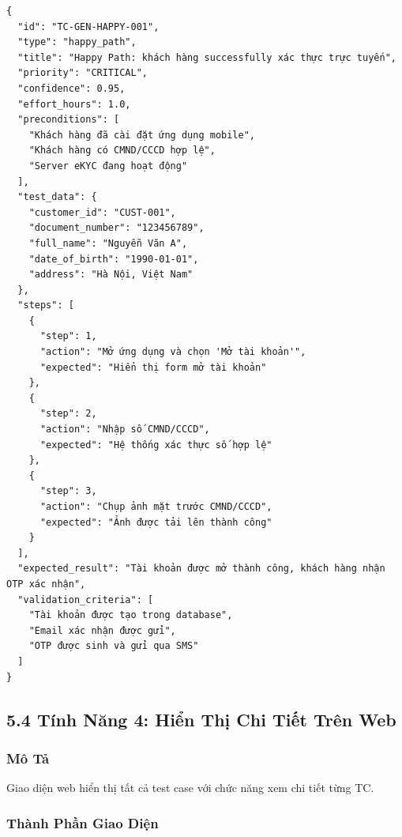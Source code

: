 \documentclass[14pt,a4paper]{article}
\begin{document}
\begin{lstlisting}
{
  "id": "TC-GEN-HAPPY-001",
  "type": "happy_path",
  "title": "Happy Path: khách hàng successfully xác thực trực tuyến",
  "priority": "CRITICAL",
  "confidence": 0.95,
  "effort_hours": 1.0,
  "preconditions": [
    "Khách hàng đã cài đặt ứng dụng mobile",
    "Khách hàng có CMND/CCCD hợp lệ",
    "Server eKYC đang hoạt động"
  ],
  "test_data": {
    "customer_id": "CUST-001",
    "document_number": "123456789",
    "full_name": "Nguyễn Văn A",
    "date_of_birth": "1990-01-01",
    "address": "Hà Nội, Việt Nam"
  },
  "steps": [
    {
      "step": 1,
      "action": "Mở ứng dụng và chọn 'Mở tài khoản'",
      "expected": "Hiển thị form mở tài khoản"
    },
    {
      "step": 2,
      "action": "Nhập số CMND/CCCD",
      "expected": "Hệ thống xác thực số hợp lệ"
    },
    {
      "step": 3,
      "action": "Chụp ảnh mặt trước CMND/CCCD",
      "expected": "Ảnh được tải lên thành công"
    }
  ],
  "expected_result": "Tài khoản được mở thành công, khách hàng nhận OTP xác nhận",
  "validation_criteria": [
    "Tài khoản được tạo trong database",
    "Email xác nhận được gửi",
    "OTP được sinh và gửi qua SMS"
  ]
}
\end{lstlisting}

\subsection{5.4 Tính Năng 4: Hiển Thị Chi Tiết Trên Web}

\subsubsection{Mô Tả}
Giao diện web hiển thị tất cả test case với chức năng xem chi tiết từng TC.

\subsubsection{Thành Phần Giao Diện}
\end{document}
